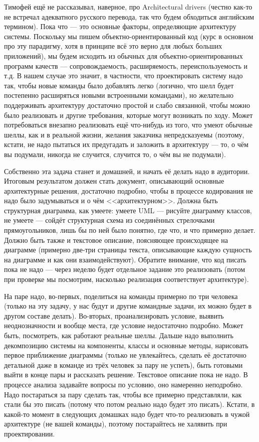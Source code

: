 \documentclass[a5paper]{article}
\begin{document}
Тимофей ещё не рассказывал, наверное, про Architectural drivers (честно как-то не встречал адекватного русского перевода, так что будем обходиться английским термином). Пока что --- это основные факторы, определяющие архитектуру системы. Поскольку мы пишем объектно-ориентированный код (курс в основном про эту парадигму, хотя в принципе всё это верно для любых больших приложений), мы будем исходить из обычных для объектно-ориентированных программ качеств --- сопровождаемость, расширяемость, переиспользуемость и т.д. В нашем случае это значит, в частности, что проектировать систему надо так, чтобы новые команды было добавлять легко (логично, что шелл будет постепенно расширяться новыми встроенными командами), но желательно поддерживать архитектуру достаточно простой и слабо связанной, чтобы можно было реализовать и другие требования, которые могут возникать по ходу. Может потребоваться внезапно реализовать ещё что-нибудь из того, что умеют обычные шеллы, как и в реальной жизни, желания заказчика непредсказуемы (поэтому, кстати, не надо пытаться их предугадать и заложить в архитектуру --- то, о чём вы подумали, никогда не случится, случится то, о чём вы не подумали).

Собственно эта задача станет и домашней, и начать её делать надо в аудитории. Итоговым результатом должен стать документ, описывающий основные архитектурные решения, достаточно подробно, чтобы в процессе кодирования не надо было задумываться и о чём <<архитектурном>>. Должна быть структурная диаграмма, как умеете: умеете UML --- рисуйте диаграмму классов, не умеете --- сойдёт структурная схема из соединённых стрелочками прямоугольников, лишь бы по ней было понятно, где что, и что примерно делает. Должно быть также и текстовое описание, поясняющее происходящее на диаграмме (примерно две-три страницы текста, описывающие каждую сущность на диаграмме и как они взаимодействуют). Обратите внимание, что код писать пока не надо --- через неделю будет отдельное задание это реализовать (потом при проверке мы посмотрим, насколько реализация соответствует архитектуре).

На паре надо, во-первых, поделиться на команды примерно по три человека (только на эту задачу, у нас будут и другие командные задачи, их можно будет в другом составе делать). Во-вторых, проанализировать условие, выявить неоднозначности и вообще места, где условие недостаточно подробно. Может быть, посмотреть, как работают реальные шеллы. Дальше надо выполнить декомпозицию системы на компоненты, классы и основные методы, нарисовать первое приближение диаграммы (только не увлекайтесь, сделать её достаточно детальной даже в команде из трёх человек за пару не успеть), быть готовыми выйти в конце пары и рассказать решение. Текстовое описание пока не надо. В процессе анализа задавайте вопросы по условию, оно намеренно неподробно. Надо постараться за пару сделать так, чтобы все примерно представляли, как стали бы это писать (потому что потом реально надо будет это писать). Кстати, в какой-то момент в следующих домашках надо будет что-то реализовать в чужой архитектуре (не вашей команды), поэтому постарайтесь не халявить при проектировании.
\end{document}

